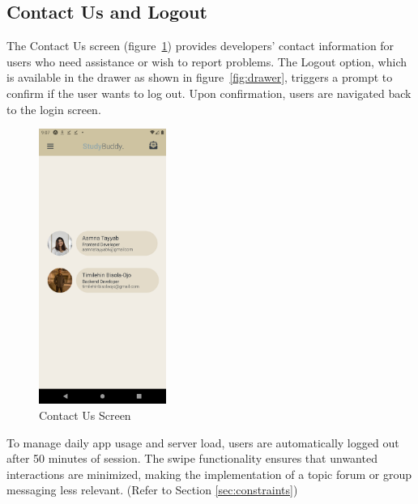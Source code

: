 \subsection{Contact Us and Logout}
The Contact Us screen (figure~\ref{fig:contactus-screen}) provides developers' contact information for users who need assistance or wish to report problems. The Logout option, which is available in the drawer as shown in figure~\ref{fig:drawer}, triggers a prompt to confirm if the user wants to log out. Upon confirmation, users are navigated back to the login screen.
    \begin{figure}[H]
	\centering
		\includegraphics[width=0.45\linewidth, width=5cm, height=9cm]{images/snapshots/contact_us.png}
        \caption{Contact Us Screen}
	\label{fig:contactus-screen}
  \end{figure}
\bigskip
To manage daily app usage and server load, users are automatically logged out after 50 minutes of session. The swipe functionality ensures that unwanted interactions are minimized, making the implementation of a topic forum or group messaging less relevant. (Refer to Section \ref{sec:constraints})
